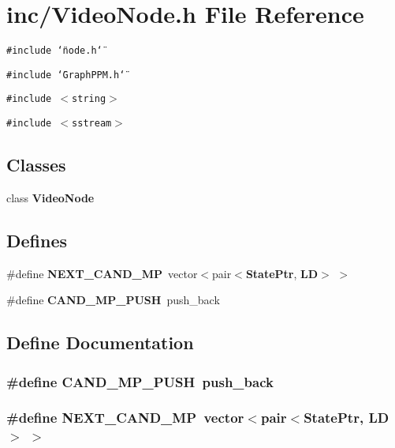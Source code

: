 \section{inc/VideoNode.h File Reference}
\label{VideoNode_8h}
{\tt \#include \char`\"{}node.h\char`\"{}}\par
{\tt \#include \char`\"{}GraphPPM.h\char`\"{}}\par
{\tt \#include $<$string$>$}\par
{\tt \#include $<$sstream$>$}\par
\subsection*{Classes}
\begin{CompactItemize}
\item 
class {\bf VideoNode}
\end{CompactItemize}
\subsection*{Defines}
\begin{CompactItemize}
\item 
\#define {\bf NEXT\_\-CAND\_\-MP}~vector$<$pair$<${\bf StatePtr}, {\bf LD}$>$ $>$
\item 
\#define {\bf CAND\_\-MP\_\-PUSH}~push\_\-back
\end{CompactItemize}


\subsection{Define Documentation}
\subsubsection{\setlength{\rightskip}{0pt plus 5cm}\#define CAND\_\-MP\_\-PUSH~push\_\-back}\label{VideoNode_8h_4b6763675e159e2161997c2bb8187aa7}


\subsubsection{\setlength{\rightskip}{0pt plus 5cm}\#define NEXT\_\-CAND\_\-MP~vector$<$pair$<${\bf StatePtr}, {\bf LD}$>$ $>$}\label{VideoNode_8h_267f91eb364117e4011a22b2a4ef396a}


